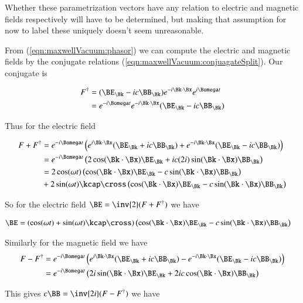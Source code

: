 Whether these parametrization vectors have any relation to electric and magnetic fields respectively will have to be determined, but making that assumption for now to label these uniquely doesn't seem unreasonable.

From (\ref{eqn:maxwellVacuum:phasor}) we can compute the electric and magnetic fields by the conjugate relations (\ref{eqn:maxwellVacuum:conjuagateSplit}).  Our conjugate is

\begin{align*}
F^\dagger
&= (\BE_\Bk - i c \BB_\Bk) e^{-i \Bk \cdot \Bx} e^{i\Bomega t} \\
&=
e^{-i\Bomega t}
e^{-i \Bk \cdot \Bx}
(\BE_\Bk - i c \BB_\Bk)
\end{align*}

Thus for the electric field

\begin{align*}
F + F^\dagger
&=
e^{-i\Bomega t} \left(
 e^{i \Bk \cdot \Bx} (\BE_\Bk + i c \BB_\Bk)
+e^{-i \Bk \cdot \Bx} (\BE_\Bk - i c \BB_\Bk)
\right) \\
&=
e^{-i\Bomega t} \left(
 2 \cos(\Bk \cdot \Bx) \BE_\Bk
+ i c (2 i) \sin(\Bk \cdot \Bx) \BB_\Bk
\right) \\
&=
2 \cos(\omega t) \left(
 \cos(\Bk \cdot \Bx) \BE_\Bk
- c \sin(\Bk \cdot \Bx) \BB_\Bk
\right) \\
&+ 2
\sin(\omega t)
\kcap \cross
\left(
 \cos(\Bk \cdot \Bx) \BE_\Bk
- c \sin(\Bk \cdot \Bx) \BB_\Bk
\right) \\
\end{align*}

So for the electric field $\BE = \inv{2}(F + F^\dagger)$ we have

\begin{align}\label{eqn:maxwellVacuum:electricSplit}
\BE &=
\left( \cos(\omega t) + \sin(\omega t) \kcap \cross \right)
\left(
 \cos(\Bk \cdot \Bx) \BE_\Bk
- c \sin(\Bk \cdot \Bx) \BB_\Bk
\right)
\end{align}

Similarly for the magnetic field we have
\begin{align*}
F - F^\dagger
&=
e^{-i\Bomega t} \left(
 e^{i \Bk \cdot \Bx} (\BE_\Bk + i c \BB_\Bk)
-e^{-i \Bk \cdot \Bx} (\BE_\Bk - i c \BB_\Bk)
\right) \\
&=
e^{-i\Bomega t} \left(
 2 i \sin(\Bk \cdot \Bx) \BE_\Bk
+ 2 i c \cos(\Bk \cdot \Bx) \BB_\Bk
\right) \\
\end{align*}

This gives $c \BB = \inv{2i}(F - F^\dagger)$ we have

